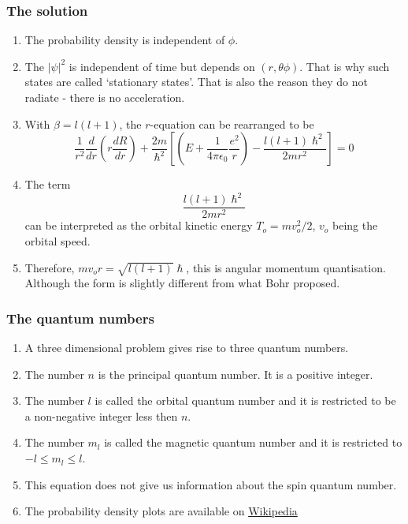 \documentclass{beamer}
\begin{document}
\begin{frame}
\frametitle{The solution}
\begin{enumerate}
\item The probability density is independent of $\phi$.
\item The $|\psi|^2$ is independent of time but depends on $(r,\theta\phi)$. 
That is why such states are called `stationary states'. That is also the reason
they do not radiate - there is no acceleration.
\item With $\beta = l(l+1)$, the $r$-equation can be rearranged to be
\begin{equation}\label{e9}
\frac{1}{r^2}\frac{d}{dr}\left(r\frac{dR}{dr}\right) + \frac{2m}{\hslash^2}
\left[\left(E + \frac{1}{4\pi\epsilon_0}\frac{e^2}{r}\right)
- \frac{l(l+1)\hslash^2}{2mr^2}\right] = 0
\end{equation}
\item The term
\[
\frac{l(l+1)\hslash^2}{2mr^2}
\]
can be interpreted as the orbital kinetic energy $T_o = mv_o^2/2$, $v_o$ being
the orbital speed.
\item Therefore, $mv_or = \sqrt{l(l+1)}\hslash$, this is angular momentum 
quantisation. Although the form is slightly different from what Bohr proposed.
\end{enumerate}
\end{frame}

\begin{frame}
\frametitle{The quantum numbers}
\begin{enumerate}
\item A three dimensional problem gives rise to three quantum numbers.
\item The number $n$ is the principal quantum number. It is a positive integer.
\item The number $l$ is called the orbital quantum number and it is restricted
to be a non-negative integer less then $n$.
\item The number $m_l$ is called the magnetic quantum number and it is restricted
to $-l \le m_l \le l$.
\item This equation does not give us information about the spin quantum number.
\item The probability density plots are available on 
\href{https://commons.wikimedia.org/wiki/File:Hydrogen_Density_Plots.png}
{Wikipedia}
\end{enumerate}
\end{frame}
\end{document}
